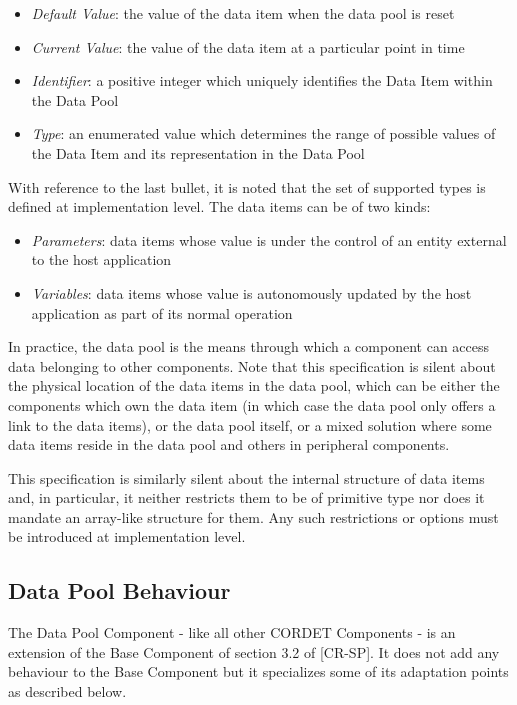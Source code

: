 \documentclass{pnp_article}
\begin{document}
\begin{itemize}
\item \textit{Default Value}: the value of the data item when the data pool is reset
\item \textit{Current Value}: the value of the data item at a particular point in time
\item \textit{Identifier}: a positive integer which uniquely identifies the Data Item within the Data Pool
\item \textit{Type}: an enumerated value which determines the range of possible values of the Data Item and its representation in the Data Pool
\end{itemize}

With reference to the last bullet, it is noted that the set of supported types is defined at implementation level. The data items can be of two kinds:

\begin{itemize}
\item \textit{Parameters}: data items whose value is under the control of an entity external to the host application 
\item \textit{Variables}: data items whose value is autonomously updated by the host application as part of its normal operation
\end{itemize}

In practice, the data pool is the means through which a component can access data belonging to other components. Note that this specification is silent about the physical location of the data items in the data pool, which can be either the components which own the data item (in which case the data pool only offers a link to the data items), or the data pool itself, or a mixed solution where some data items reside in the data pool and others in peripheral components. 

This specification is similarly silent about the internal structure of data items and, in particular, it neither restricts them to be of primitive type nor does it mandate an array-like structure for them. Any such restrictions or options must be introduced at implementation level.

\subsection{Data Pool Behaviour}\label{sec:dpBehaviour}
The Data Pool Component - like all other CORDET Components - is an extension of the Base Component of section 3.2 of [CR-SP]. It does not add any behaviour to the Base Component but it specializes some of its adaptation points as described below.
\end{document}

